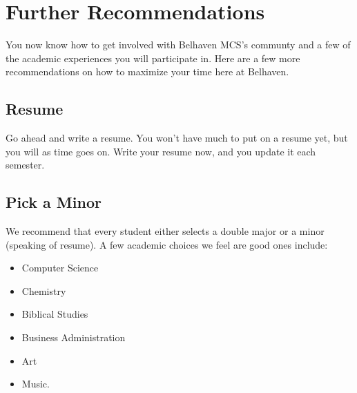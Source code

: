 
\section{Further Recommendations}

You now know how to get involved with Belhaven MCS's communty and a few of the academic experiences you will participate in. Here are a few more recommendations on how to maximize your time here at Belhaven.

\subsection{Resume}

Go ahead and write a resume. You won't have much to put on a resume yet, but you will as time goes on. Write your resume now, and you update it each semester.

\subsection{Pick a Minor}

We recommend that every student either selects a double major or a minor (speaking of resume). A few academic choices we feel are good ones include: 

\begin{itemize}
    \item Computer Science 
    \item Chemistry
    \item Biblical Studies
    \item Business Administration
    \item Art
    \item Music.
\end{itemize}